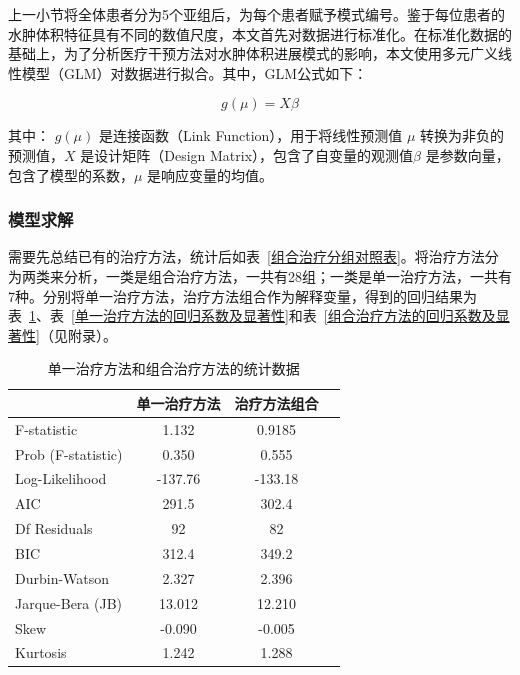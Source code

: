 \documentclass[bwprint]{gmcmthesis}
\begin{document}
上一小节将全体患者分为5个亚组后，为每个患者赋予模式编号。鉴于每位患者的水肿体积特征具有不同的数值尺度，本文首先对数据进行标准化。在标准化数据的基础上，为了分析医疗干预方法对水肿体积进展模式的影响，本文使用多元广义线性模型（GLM）对数据进行拟合。其中，GLM公式如下：

\begin{equation}
g(\mu) = X\beta
\end{equation}

\noindent 其中：
$g(\mu)$ 是连接函数（Link Function），用于将线性预测值 $\mu$ 转换为非负的预测值，$X$ 是设计矩阵（Design Matrix），包含了自变量的观测值$\beta$ 是参数向量，包含了模型的系数，$\mu$ 是响应变量的均值。

\subsubsection{模型求解}

需要先总结已有的治疗方法，统计后如表~\ref{组合治疗分组对照表}。将治疗方法分为两类来分析，一类是组合治疗方法，一共有28组；一类是单一治疗方法，一共有7种。分别将单一治疗方法，治疗方法组合作为解释变量，得到的回归结果为表~\ref{单一治疗方法和治疗方法组合的统计数据}、表~\ref{单一治疗方法的回归系数及显著性}和表~\ref{组合治疗方法的回归系数及显著性}（见附录）。

\begin{table}[htbp]
\centering
\caption{单一治疗方法和组合治疗方法的统计数据}
\label{单一治疗方法和治疗方法组合的统计数据}
\begin{tabular}{lccc}
\toprule
& 单一治疗方法 & 治疗方法组合 \\
\midrule
F-statistic & 1.132 & 0.9185 \\
Prob (F-statistic) & 0.350 & 0.555 \\
Log-Likelihood & -137.76 & -133.18 \\
AIC & 291.5 & 302.4 \\
Df Residuals & 92 & 82 \\
BIC & 312.4 & 349.2 \\
Durbin-Watson & 2.327 & 2.396 \\
Jarque-Bera (JB) & 13.012 & 12.210 \\
Skew & -0.090 & -0.005 \\
Kurtosis & 1.242 & 1.288 \\
\bottomrule
\end{tabular}
\end{table}
\end{document}
